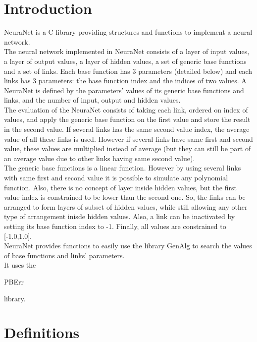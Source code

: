 \section*{Introduction}

NeuraNet is a C library providing structures and functions to implement a neural network.\\ 

The neural network implemented in NeuraNet consists of a layer of input values, a layer of output values, a layer of hidden values, a set of generic base functions and a set of links. Each base function has 3 parameters (detailed below) and each links has 3 parameters: the base function index and the indices of two values. A NeuraNet is defined by the parameters' values of its generic base functions and links, and the number of input, output and hidden values.\\

The evaluation of the NeuraNet consists of taking each link, ordered on index of values, and apply the generic base function on the first value and store the result in the second value. If several links has the same second value index, the average value of all these links is used. However if several links have same first and second value, these values are multiplied instead of average (but they can still be part of an average value due to other links having same second value).\\

The generic base functions is a linear function. However by using several links with same first and second value it is possible to simulate any polynomial function. Also, there is no concept of layer inside hidden values, but the first value index is constrained to be lower than the second one. So, the links can be arranged to form layers of subset of hidden values, while still allowing any other type of arrangement inisde hidden values. Also, a link can be inactivated by setting its base function index to -1. Finally, all values are constrained to [-1.0,1.0].\\

NeuraNet provides functions to easily use the library GenAlg to search the values of base functions and links' parameters.\\

It uses the \begin{ttfamily}PBErr\end{ttfamily} library.\\

\section{Definitions}

